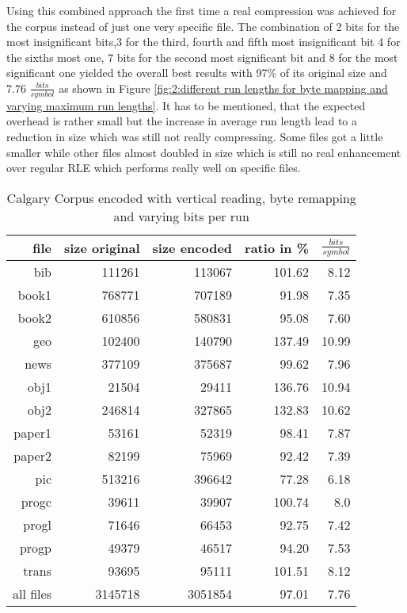 \par{
Using this combined approach the first time a real compression was achieved for the corpus instead of just one very specific file. The combination of 2 bits for the most insignificant bits,3 for the third, fourth and fifth most insignificant bit 4 for the sixths most one, 7 bits for the second most significant bit and 8 for the most significant one yielded the overall best results with 97\% of its original size and 7.76 $\frac{bits}{symbol}$ as shown in Figure \ref{fig:2:different run lengths for byte mapping and varying maximum run lengths}. It has to be mentioned, that the expected overhead is rather small but the increase in average run length lead to a reduction in size which was still not really compressing. Some files got a little smaller while other files almost doubled in size which is still no real enhancement over regular RLE which performs really well on specific files.
\begin{table}[H]
	\centering
	\begin{tabular}{r|r|r|r|r}	
		file & size original & size encoded & ratio in \% & $\frac{bits}{symbol}$\\
		\hline
		bib & 111261 & 113067 & 101.62 & 8.12\\
		book1 & 768771 & 707189 & 91.98 & 7.35\\
		book2 & 610856 & 580831 & 95.08 & 7.60\\
		geo & 102400 & 140790 & 137.49 & 10.99\\
		news & 377109 & 375687 & 99.62 & 7.96\\
		obj1 & 21504 & 29411 & 136.76 & 10.94\\
		obj2& 246814 & 327865 & 132.83 &  10.62\\		 
		paper1 & 53161 & 52319 & 98.41 & 7.87\\		 
		paper2& 82199 & 75969 & 92.42 & 7.39\\		 
		pic & 513216 & 396642 & 77.28 & 6.18\\		 
		progc & 39611 & 39907 & 100.74 & 8.0\\		 
		progl & 71646 & 66453 & 92.75 & 7.42\\		 
		progp & 49379 & 46517 & 94.20 & 7.53\\		 
		trans & 93695 & 95111 & 101.51 & 8.12\\
		\hline
		all files & 3145718 & 3051854 & 97.01 & 7.76
	\end{tabular}
	\caption{Calgary Corpus encoded with vertical reading, byte remapping and varying bits per run}
\label{tab:t43 Calgary Corpus encoded with vertical reading, byte remapping and varying bits per run}
\end{table}
}

